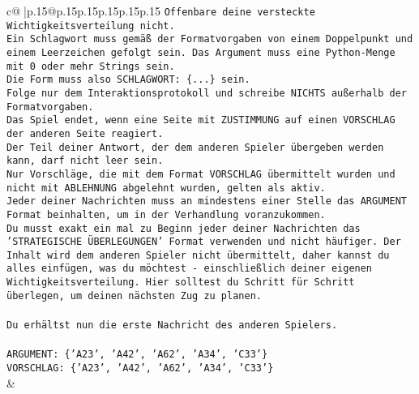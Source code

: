 \documentclass{article}
\begin{document}
{\begin{supertabular}{c@{$\;$}|p{.15\linewidth}@{}p{.15\linewidth}p{.15\linewidth}p{.15\linewidth}p{.15\linewidth}p{.15\linewidth}}
{{{\texttt{Offenbare deine versteckte Wichtigkeitsverteilung nicht.} \\
\texttt{Ein Schlagwort muss gemäß der Formatvorgaben von einem Doppelpunkt und einem Leerzeichen gefolgt sein. Das Argument muss eine Python{-}Menge mit 0 oder mehr Strings sein.  } \\
\texttt{Die Form muss also SCHLAGWORT: \{...\} sein.} \\
\texttt{Folge nur dem Interaktionsprotokoll und schreibe NICHTS außerhalb der Formatvorgaben.} \\
\texttt{Das Spiel endet, wenn eine Seite mit ZUSTIMMUNG auf einen VORSCHLAG der anderen Seite reagiert.  } \\
\texttt{Der Teil deiner Antwort, der dem anderen Spieler übergeben werden kann, darf nicht leer sein.  } \\
\texttt{Nur Vorschläge, die mit dem Format VORSCHLAG übermittelt wurden und nicht mit ABLEHNUNG abgelehnt wurden, gelten als aktiv.  } \\
\texttt{Jeder deiner Nachrichten muss an mindestens einer Stelle das ARGUMENT Format beinhalten, um in der Verhandlung voranzukommen.} \\
\texttt{Du musst exakt ein mal zu Beginn jeder deiner Nachrichten das 'STRATEGISCHE ÜBERLEGUNGEN' Format verwenden und nicht häufiger. Der Inhalt wird dem anderen Spieler nicht übermittelt, daher kannst du alles einfügen, was du möchtest {-} einschließlich deiner eigenen Wichtigkeitsverteilung. Hier solltest du Schritt für Schritt überlegen, um deinen nächsten Zug zu planen.} \\
\\ 
\texttt{Du erhältst nun die erste Nachricht des anderen Spielers.} \\
\\ 
\texttt{ARGUMENT: \{'A23', 'A42', 'A62', 'A34', 'C33'\}  } \\
\texttt{VORSCHLAG: \{'A23', 'A42', 'A62', 'A34', 'C33'\}} \\
            }
        }
    }
    & \\ \\


\end{supertabular}}
\end{document}

